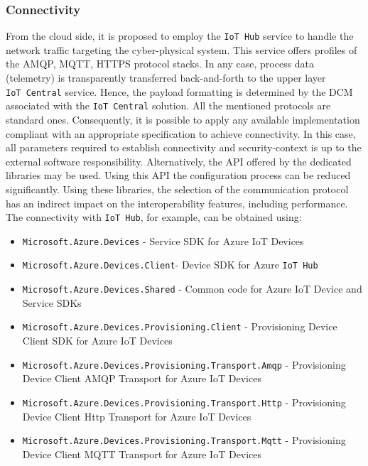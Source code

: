 \documentclass{jacsart}
\providecommand{\tightlist} { \setlength{\itemsep}{0pt}\setlength{\parskip}{0pt}}
\begin{document}
\subsubsection{Connectivity}\label{connectivity}

From the cloud side, it is proposed to employ the \texttt{IoT\ Hub}
service to handle the network traffic targeting the cyber-physical
system. This service offers profiles of the AMQP, MQTT, HTTPS protocol
stacks. In any case, process data (telemetry) is transparently
transferred back-and-forth to the upper layer \texttt{IoT\ Central}
service. Hence, the payload formatting is determined by the DCM
associated with the \texttt{IoT\ Central} solution. All the mentioned
protocols are standard ones. Consequently, it is possible to apply any
available implementation compliant with an appropriate specification to
achieve connectivity. In this case, all parameters required to establish
connectivity and security-context is up to the external software
responsibility. Alternatively, the API offered by the dedicated
libraries may be used. Using this API the configuration process can be
reduced significantly. Using these libraries, the selection of the
communication protocol has an indirect impact on the interoperability
features, including performance. The connectivity with
\texttt{IoT\ Hub}, for example, can be obtained using:

\begin{itemize}
      \tightlist
      \item
            \texttt{Microsoft.Azure.Devices} - Service SDK for Azure IoT Devices
      \item
            \texttt{Microsoft.Azure.Devices.Client}- Device SDK for Azure \texttt{IoT\ Hub}
      \item
            \texttt{Microsoft.Azure.Devices.Shared} - Common code for Azure IoT
            Device and Service SDKs
      \item
            \texttt{Microsoft.Azure.Devices.Provisioning.Client} - Provisioning
            Device Client SDK for Azure IoT Devices
      \item
            \texttt{Microsoft.Azure.Devices.Provisioning.Transport.Amqp} -
            Provisioning Device Client AMQP Transport for Azure IoT Devices
      \item
            \texttt{Microsoft.Azure.Devices.Provisioning.Transport.Http} -
            Provisioning Device Client Http Transport for Azure IoT Devices
      \item
            \texttt{Microsoft.Azure.Devices.Provisioning.Transport.Mqtt} -
            Provisioning Device Client MQTT Transport for Azure IoT Devices
\end{itemize}
\end{document}
